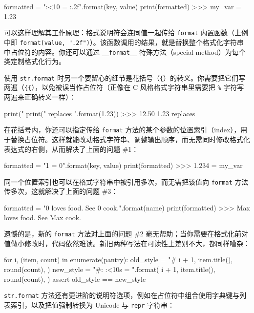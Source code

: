 \begin{codebox}[python]
formatted = "{:<10} = {:.2f}".format(key, value)
print(formatted)
>>>
my_var     = 1.23
\end{codebox}

可以这样理解其工作原理：格式说明符会连同值一起传给 \texttt{format} 内置函数（上例中即 \texttt{format(value, ".2f")}）。该函数调用的结果，就是替换整个格式化字符串中占位符的内容。你还可以通过 \texttt{\_\_format\_\_} 特殊方法（special method）为每个类定制格式化行为。

使用 \texttt{str.format} 时另一个要留心的细节是花括号（\texttt{\{}）的转义。你需要把它们写两遍（\texttt{\{\{}），以免被误当作占位符（正像在 C 风格格式字符串里需要把 \texttt{\%} 字符写两遍来正确转义一样）：

\begin{codebox}[python]
print("%
print("{} replaces {{}}".format(1.23))
>>>
12.50%
1.23 replaces {}
\end{codebox}

在花括号内，你还可以指定传给 \texttt{format} 方法的某个参数的位置索引（index），用于替换占位符。这样就能改动格式字符串、调整输出顺序，而无需同时修改格式化表达式的右侧，从而解决了上面的问题 \#1：

\begin{codebox}[python]
formatted = "{1} = {0}".format(key, value)
print(formatted)
>>>
1.234 = my_var
\end{codebox}

同一个位置索引也可以在格式字符串中被引用多次，而无需把该值向 \texttt{format} 方法传多次，这就解决了上面的问题 \#3：

\begin{codebox}[python]
formatted = "{0} loves food. See {0} cook.".format(name)
print(formatted)
>>>
Max loves food. See Max cook.
\end{codebox}

遗憾的是，新的 \texttt{format} 方法对上面的问题 \#2 毫无帮助；当你需要在格式化前对值做小修改时，代码依然难读。新旧两种写法在可读性上差别不大，都同样嘈杂：

\begin{codebox}[python]
for i, (item, count) in enumerate(pantry):
    old_style = "#%
        i + 1,
        item.title(),
        round(count),
    )
    new_style = "#{}: {:<10s} = {}".format(
        i + 1,
        item.title(),
        round(count),
    )
    assert old_style == new_style
\end{codebox}

\texttt{str.format} 方法还有更进阶的说明符选项，例如在占位符中组合使用字典键与列表索引，以及把值强制转换为 Unicode 与 \texttt{repr} 字符串：

